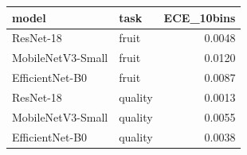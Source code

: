 \begin{tabular}{llr}
\toprule
model & task & ECE_10bins \\
\midrule
ResNet-18 & fruit & 0.0048 \\
MobileNetV3-Small & fruit & 0.0120 \\
EfficientNet-B0 & fruit & 0.0087 \\
ResNet-18 & quality & 0.0013 \\
MobileNetV3-Small & quality & 0.0055 \\
EfficientNet-B0 & quality & 0.0038 \\
\bottomrule
\end{tabular}
